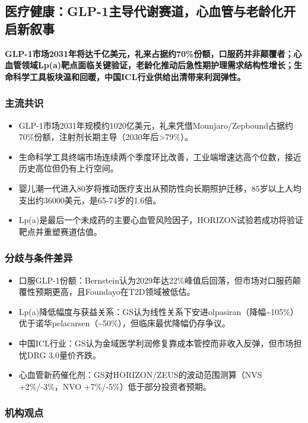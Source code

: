 \documentclass[11pt]{ctexart}
\begin{document}
\subsection{医疗健康：GLP-1主导代谢赛道，心血管与老龄化开启新叙事}
\textbf{GLP-1市场2031年将达千亿美元，礼来占据约70\%份额，口服药并非颠覆者；心血管领域Lp(a)靶点面临关键验证，老龄化推动后急性期护理需求结构性增长；生命科学工具板块温和回暖，中国ICL行业供给出清带来利润弹性。}
\subsubsection*{主流共识}
\begin{itemize}
  \item GLP-1市场2031年规模约1020亿美元，礼来凭借Mounjaro/Zepbound占据约70\%份额，注射剂长期主导（2030年后>79\%）。
  \item 生命科学工具终端市场连续两个季度环比改善，工业端增速达高个位数，接近历史高位但仍有上行空间。
  \item 婴儿潮一代进入80岁将推动医疗支出从预防性向长期照护迁移，85岁以上人均支出约36000美元，是65-74岁的1.6倍。
  \item Lp(a)是最后一个未成药的主要心血管风险因子，HORIZON试验若成功将验证靶点并重塑赛道估值。
\end{itemize}
\subsubsection*{分歧与条件差异}
\begin{itemize}
  \item 口服GLP-1份额：Bernstein认为2029年达22\%峰值后回落，但市场对口服药颠覆性预期更高，且Foundayo在T2D领域被低估。
  \item Lp(a)降低幅度与获益关系：GS认为线性关系下安进olpasiran（降幅\textasciitilde{}105\%）优于诺华pelacarsen（\textasciitilde{}50\%），但临床最优降幅仍存争议。
  \item 中国ICL行业：GS认为金域医学利润修复靠成本管控而非收入反弹，但市场担忧DRG 3.0量价齐跌。
  \item 心血管新药催化剂：GS对HORIZON/ZEUS的波动范围测算（NVS +2\%/-3\%，NVO +7\%/-5\%）低于部分投资者预期。
\end{itemize}
\subsubsection*{机构观点}
\end{document}
